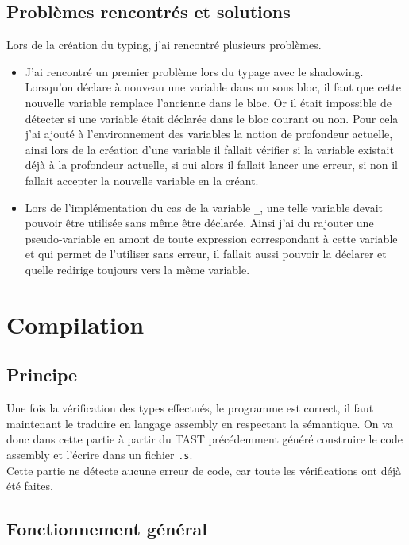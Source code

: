\documentclass[10pt]{report}
\begin{document}
\subsection{Problèmes rencontrés et solutions}

Lors de la création du typing, j'ai rencontré plusieurs problèmes.
\begin{itemize}
  \item J'ai rencontré un premier problème lors du typage avec le shadowing. Lorsqu'on déclare à nouveau une variable dans un sous bloc, il faut que cette nouvelle variable remplace l'ancienne dans le bloc. Or il était impossible de détecter si une variable était déclarée dans le bloc courant ou non. Pour cela j'ai ajouté à l'environnement des variables la notion de profondeur actuelle, ainsi lors de la création d'une variable il fallait vérifier si la variable existait déjà à la profondeur actuelle, si oui alors il fallait lancer une erreur, si non il fallait accepter la nouvelle variable en la créant.
  \item Lors de l'implémentation du cas de la variable \verb|_|, une telle variable devait pouvoir être utilisée sans même être déclarée. Ainsi j'ai du rajouter une pseudo-variable en amont de toute expression correspondant à cette variable et qui permet de l'utiliser sans erreur, il fallait aussi pouvoir la déclarer et quelle redirige toujours vers la même variable.
\end{itemize}

\section{Compilation}

\subsection{Principe}

Une fois la vérification des types effectués, le programme est correct, il faut maintenant le traduire en langage assembly en respectant la sémantique. On va donc dans cette partie à partir du TAST précédemment généré construire le code assembly et l'écrire dans un fichier \verb|.s|. \\
\indent Cette partie ne détecte aucune erreur de code, car toute les vérifications ont déjà été faites.

\subsection{Fonctionnement général}
\end{document}
